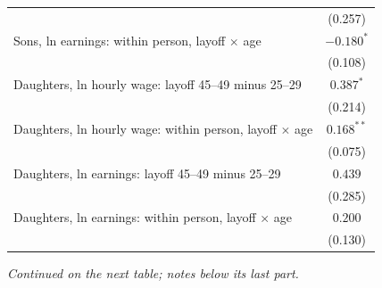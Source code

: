 \begin{table}[!htbp]
{{\begin{tabular}{lc}
 & (0.257) \\
Sons, ln earnings: within person, layoff $\times$ age & $-0.180^{*}$ \\
 & (0.108) \\
Daughters, ln hourly wage: layoff 45--49 minus 25--29 & $0.387^{*}$ \\
 & (0.214) \\
Daughters, ln hourly wage: within person, layoff $\times$ age & $0.168^{**}$ \\
 & (0.075) \\
Daughters, ln earnings: layoff 45--49 minus 25--29 & $0.439$ \\
 & (0.285) \\
Daughters, ln earnings: within person, layoff $\times$ age & $0.200$ \\
 & (0.130) \\
\bottomrule
\end{tabular}}}
\par\smallskip
\begin{minipage}{\textwidth}\footnotesize \textit{Continued on the next table; notes below its last part.}\end{minipage}
\end{table}
